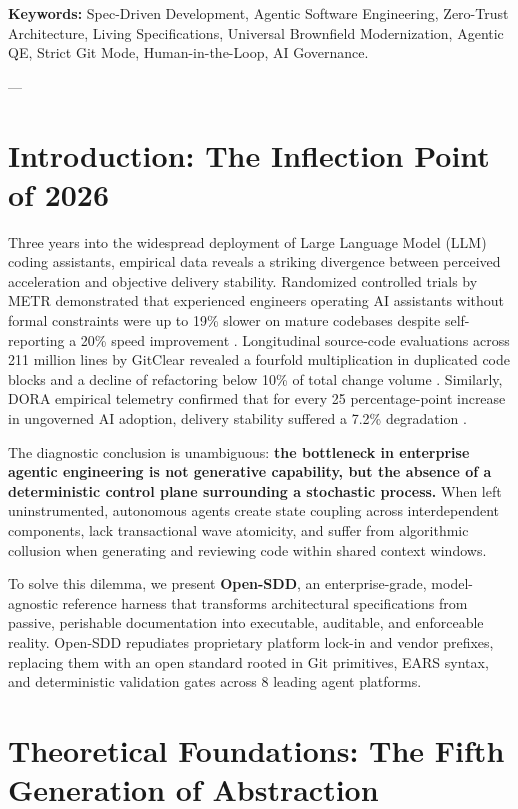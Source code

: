 \documentclass[11pt,a4paper]{article}
\begin{document}
\noindent\textbf{Keywords:} Spec-Driven Development, Agentic Software Engineering, Zero-Trust Architecture, Living Specifications, Universal Brownfield Modernization, Agentic QE, Strict Git Mode, Human-in-the-Loop, AI Governance.

---

\section{Introduction: The Inflection Point of 2026}

Three years into the widespread deployment of Large Language Model (LLM) coding assistants, empirical data reveals a striking divergence between perceived acceleration and objective delivery stability. Randomized controlled trials by METR demonstrated that experienced engineers operating AI assistants without formal constraints were up to 19\% slower on mature codebases despite self-reporting a 20\% speed improvement \cite{metr2025}. Longitudinal source-code evaluations across 211 million lines by GitClear revealed a fourfold multiplication in duplicated code blocks and a decline of refactoring below 10\% of total change volume \cite{gitclear2025}. Similarly, DORA empirical telemetry confirmed that for every 25 percentage-point increase in ungoverned AI adoption, delivery stability suffered a 7.2\% degradation \cite{dora2024}.

The diagnostic conclusion is unambiguous: \textbf{the bottleneck in enterprise agentic engineering is not generative capability, but the absence of a deterministic control plane surrounding a stochastic process.} When left uninstrumented, autonomous agents create state coupling across interdependent components, lack transactional wave atomicity, and suffer from algorithmic collusion when generating and reviewing code within shared context windows.

To solve this dilemma, we present \textbf{Open-SDD}, an enterprise-grade, model-agnostic reference harness that transforms architectural specifications from passive, perishable documentation into executable, auditable, and enforceable reality. Open-SDD repudiates proprietary platform lock-in and vendor prefixes, replacing them with an open standard rooted in Git primitives, EARS syntax, and deterministic validation gates across 8 leading agent platforms.

\section{Theoretical Foundations: The Fifth Generation of Abstraction}
\end{document}
